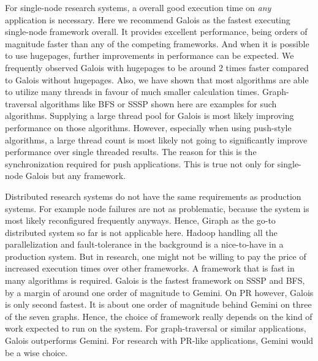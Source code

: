 For single-node research systems, a overall good execution time on \emph{any} application is necessary. 
Here we recommend Galois as the fastest executing single-node framework overall.
It provides excellent performance, being orders of magnitude faster than any of the competing frameworks. And when it is possible to use hugepages, further improvements in performance can be expected. We frequently observed Galois with hugepages to be around 2 times faster compared to Galois without hugepages.
Also, we have shown that most algorithms are able to utilize many threads in favour of much smaller calculation times. Graph-traversal algorithms like BFS or SSSP shown here are examples for such algorithms.
Supplying a large thread pool for Galois is most likely improving performance on those algorithms.
However, especially when using push-style algorithms, a large thread count is most likely not going to significantly improve performance over single threaded results. 
The reason for this is the synchronization required for push applications. This is true not only for single-node Galois but any framework.

Distributed research systems do not have the same requirements as production systems. For example node failures are not as problematic, because the system is most likely reconfigured frequently anyways.
Hence, Giraph as the go-to distributed system so far is not applicable here. Hadoop handling all the parallelization and fault-tolerance in the background is a nice-to-have in a production system. But in research, one might not be willing to pay the price of increased execution times over other frameworks.
A framework that is fast in many algorithms is required. 
Galois is the fastest framework on SSSP and BFS, by a margin of around one order of magnitude to Gemini. 
On PR however, Galois is only second fastest. It is about one order of magnitude behind Gemini on three of the seven graphs.
Hence, the choice of framework really depends on the kind of work expected to run on the system. For graph-traversal or similar applications, Galois outperforms Gemini. For research with PR-like applications, Gemini would be a wise choice.

